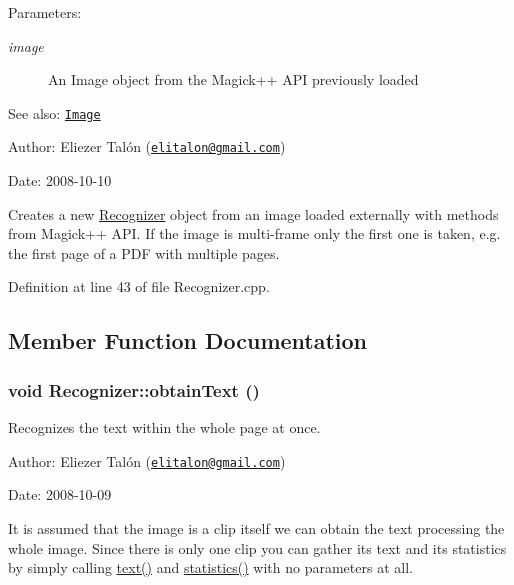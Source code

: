 \begin{Desc}
\item[Parameters:]
\begin{description}
\item[{\em image}]An Image object from the Magick++ API previously loaded\end{description}
\end{Desc}
\begin{Desc}
\item[See also:]\href{http://www.imagemagick.org/Magick++/Image.html}{\tt Image}\end{Desc}
\begin{Desc}
\item[Author:]Eliezer Talón (\href{mailto:elitalon@gmail.com}{\tt elitalon@gmail.com}) \end{Desc}
\begin{Desc}
\item[Date:]2008-10-10\end{Desc}
Creates a new \hyperlink{class_recognizer}{Recognizer} object from an image loaded externally with methods from Magick++ API. If the image is multi-frame only the first one is taken, e.g. the first page of a PDF with multiple pages. 

Definition at line 43 of file Recognizer.cpp.

\subsection{Member Function Documentation}
\hypertarget{class_recognizer_008a0ea69a912ff54882dd20d18adcf9}{
\subsubsection[obtainText]{\setlength{\rightskip}{0pt plus 5cm}void Recognizer::obtainText ()}}
\label{class_recognizer_008a0ea69a912ff54882dd20d18adcf9}


Recognizes the text within the whole page at once. 

\begin{Desc}
\item[Author:]Eliezer Talón (\href{mailto:elitalon@gmail.com}{\tt elitalon@gmail.com}) \end{Desc}
\begin{Desc}
\item[Date:]2008-10-09\end{Desc}
It is assumed that the image is a clip itself we can obtain the text processing the whole image. Since there is only one clip you can gather its text and its statistics by simply calling \hyperlink{class_recognizer_c5d20b511888a60a6c1a81c0a4206ec2}{text()} and \hyperlink{class_recognizer_8b38356d2741969e67cd6b4f507897ba}{statistics()} with no parameters at all. 

